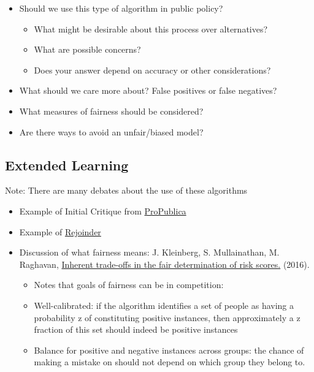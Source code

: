 \documentclass[
  letterpaper,
  DIV=11,
  numbers=noendperiod]{scrreprt}
\providecommand{\tightlist}{%
  \setlength{\itemsep}{0pt}\setlength{\parskip}{0pt}}\usepackage{longtable,booktabs,array}
\begin{document}
\begin{itemize}
\tightlist
\item
  Should we use this type of algorithm in public policy?

  \begin{itemize}
  \tightlist
  \item
    What might be desirable about this process over alternatives?
  \item
    What are possible concerns?
  \item
    Does your answer depend on accuracy or other considerations?
  \end{itemize}
\item
  What should we care more about? False positives or false negatives?
\item
  What measures of fairness should be considered?
\item
  Are there ways to avoid an unfair/biased model?
\end{itemize}

\hypertarget{extended-learning}{%
\subsection{Extended Learning}\label{extended-learning}}

Note: There are many debates about the use of these algorithms

\begin{itemize}
\tightlist
\item
  Example of Initial Critique from
  \href{https://www.propublica.org/article/machine-bias-risk-assessments-in-criminal-sentencing}{ProPublica}
\item
  Example of
  \href{https://www.uscourts.gov/federal-probation-journal/2016/09/false-positives-false-negatives-and-false-analyses-rejoinder}{Rejoinder}
\item
  Discussion of what fairness means: J. Kleinberg, S. Mullainathan, M.
  Raghavan, \href{https://arxiv.org/abs/1609.05807v2}{Inherent
  trade-offs in the fair determination of risk scores.} (2016).

  \begin{itemize}
  \tightlist
  \item
    Notes that goals of fairness can be in competition:
  \item
    Well-calibrated: if the algorithm identifies a set of people as
    having a probability z of constituting positive instances, then
    approximately a z fraction of this set should indeed be positive
    instances
  \item
    Balance for positive and negative instances across groups: the
    chance of making a mistake on should not depend on which group they
    belong to.
  \end{itemize}
\end{itemize}
\end{document}
